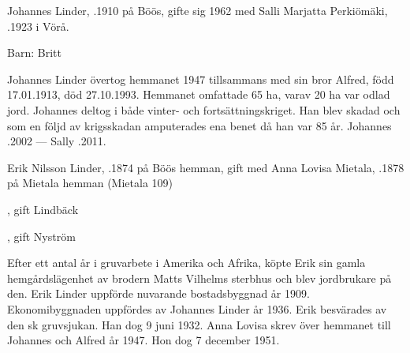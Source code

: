 %
Johannes Linder, .1910 på Böös, gifte sig 1962 med Salli Marjatta Perkiömäki, .1923 i Vörå.

Barn: Britt 

Johannes Linder övertog hemmanet 1947 tillsammans med sin bror Alfred, född 17.01.1913, död 27.10.1993. Hemmanet omfattade 65 ha, varav 20 ha var odlad jord. Johannes deltog i både vinter- och fortsättningskriget. Han blev skadad och som en följd av krigsskadan amputerades ena benet då han var 85 år.
Johannes .2002  ---  Sally .2011.



%
Erik Nilsson Linder, .1874 på Böös hemman, gift med Anna Lovisa Mietala, .1878 på Mietala hemman (Mietala 109)
\begin{jhchildren}
  \item {}
  \item {}, gift Lindbäck
  \item {}
  \item {}, gift Nyström
  \item {}
  \item {}
  \item {}
  \item {}
  \item {}
\end{jhchildren}

Efter ett antal år i gruvarbete i Amerika och Afrika, köpte  Erik sin gamla hemgårdslägenhet av brodern Matts Vilhelms sterbhus och blev jordbrukare på den. Erik Linder uppförde nuvarande bostadsbyggnad år 1909. Ekonomibyggnaden uppfördes av Johannes Linder år 1936. Erik besvärades  av den sk gruvsjukan. Han  dog 9 juni 1932. Anna Lovisa skrev över hemmanet till Johannes och Alfred år 1947. Hon dog 7 december 1951.


